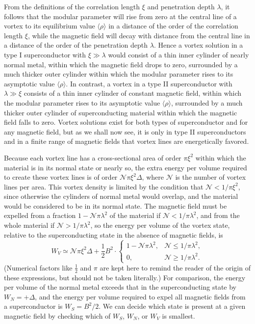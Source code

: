 From the definitions of the correlation length $\xi$ and penetration depth $\lambda$, it follows that the modular parameter will rise from zero at the central line of a vortex to its equilibrium value $\langle\rho\rangle$ in a distance of the order of the correlation length $\xi$, while the magnetic field will decay with distance from the central line in a distance of the order of the penetration depth $\lambda$. Hence a vortex solution in a type I superconductor with $\xi\gg\lambda$ would consist of a thin inner cylinder of nearly normal metal, within which the magnetic field drops to zero, surrounded by a much thicker outer cylinder within which the modular parameter rises to its asymptotic value $\langle\rho\rangle$. In contrast, a vortex in a type II superconductor with $\lambda\gg\xi$ consists of a thin inner cylinder of constant magnetic field, within which the modular parameter rises to its asymptotic value $\langle\rho\rangle$, surrounded by a much thicker outer cylinder of superconducting material within which the magnetic field falls to zero. Vortex solutions exist for both types of superconductor and for any magnetic field, but as we shall now see, it is only in type II superconductors and in a finite range of magnetic fields that vortex lines are energetically favored.

Because each vortex line has a cross-sectional area of order $\pi\xi^2$ within which the material is in its normal state or nearly so, the extra energy per volume required to create these vortex lines is of order $\mathcal N\pi\xi^2\Delta$, where $\mathcal N$ is the number of vortex lines per area. This vortex density is limited by the condition that $\mathcal N<1/\pi\xi^2$, since otherwise the cylinders of normal metal would overlap, and the material would be considered to be in its normal state. The magnetic field must be expelled from a fraction $1-\mathcal N\pi\lambda^2$ of the material if $\mathcal N<1/\pi\lambda^2$, and from the whole material if $\mathcal N>1/\pi\lambda^2$, so the energy per volume of the vortex state, relative to the superconducting state in the absence of magnetic fields, is
\begin{equation}
W_V\simeq\mathcal N\pi\xi^2\Delta
+\frac12B^2\cdot
\begin{cases}
1-\mathcal N\pi\lambda^2,
&\mathcal N\le 1/\pi\lambda^2,\\
0,
&\mathcal N\ge 1/\pi\lambda^2.
\end{cases}
\tag{21.6.29}\label{eq:21.6.29}
\end{equation}
(Numerical factors like $\frac12$ and $\pi$ are kept here to remind the reader of the origin of these expressions, but should not be taken literally.) For comparison, the energy per volume of the normal metal exceeds that in the superconducting state by $W_N=+\Delta$, and the energy per volume required to expel all magnetic fields from a superconductor is $W_S=B^2/2$. We can decide which state is present at a given magnetic field by checking which of $W_S$, $W_N$, or $W_V$ is smallest.

